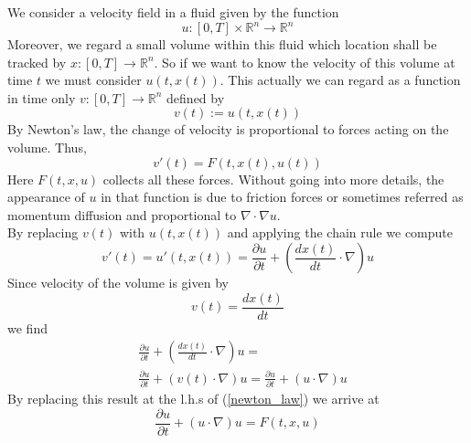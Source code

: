 \documentclass[17pt]{extarticle}
\begin{document}
	We consider a velocity field in a fluid given by the function 
	$$
	u:[0,T]\times\mathbb{R}^n\rightarrow\mathbb{R}^n
	$$
	Moreover, we regard a small volume within this fluid which location shall be tracked by $x:[0,T]\rightarrow\mathbb{R}^n$.
	So if we want to know the velocity of this volume at time $t$ we must consider $u(t, x(t))$. This actually we can regard as a function in time only $v:[0,T]\rightarrow\mathbb{R}^n$ defined by 
	$$
	v(t):=u(t, x(t))
	$$
	By Newton's law, the change of velocity is proportional to forces acting on the volume. Thus,
	\begin{equation} \label{newton_law}
	v'(t)=F(t,x(t), u(t))
	\end{equation}
	Here $F(t, x, u)$ collects all these forces. Without going into more details, the appearance of $u$ in that function is due to friction forces or sometimes referred as momentum diffusion and proportional to $\nabla\cdot\nabla u$.\\
	By replacing $v(t)$ with $u(t, x(t))$ and applying the chain rule we compute
	\begin{equation*}
	v'(t)=u'(t, x(t))=\frac{\partial u}{\partial t}+
	\left(\frac{d x(t)}{dt}\cdot \nabla \right)u
	\end{equation*}
	Since velocity of the volume is given by
	$$
	v(t)=\frac{d x(t)}{dt}
	$$
	we find
	\begin{align*}
	&	\frac{\partial u}{\partial t}+
		\left(\frac{d x(t)}{dt}\cdot \nabla \right)u=\\
	&\frac{\partial u}{\partial t}+
	\left(v(t)\cdot \nabla \right)u=\frac{\partial u}{\partial t}+
	\left(u\cdot \nabla \right)u
	\end{align*}
	By replacing this result at the l.h.s of (\ref{newton_law}) we arrive at
	$$
	\frac{\partial u}{\partial t}+
	\left(u\cdot \nabla \right)u=F(t,x, u)
	$$	
\end{document}
